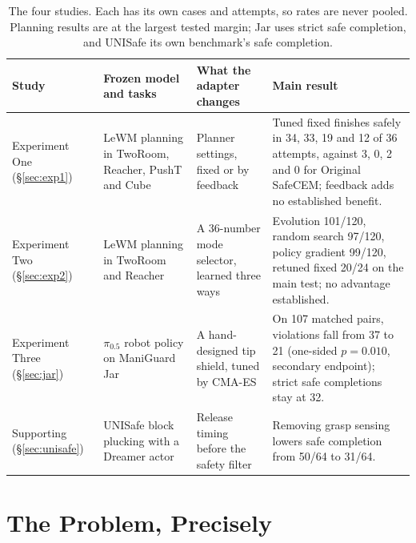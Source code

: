 \documentclass[sigconf,nonacm]{acmart}
\begin{document}
\begin{table}[t]
\caption{The four studies. Each has its own cases and attempts, so rates
are never pooled. Planning results are at the largest tested margin; Jar
uses strict safe completion, and UNISafe its own benchmark's safe
completion.}
\label{tab:studies}\centering\small
\begin{tabularx}{\textwidth}{@{}>{\raggedright\arraybackslash}p{2.3cm}>{\raggedright\arraybackslash}p{3.4cm}>{\raggedright\arraybackslash}p{3.4cm}>{\raggedright\arraybackslash}X@{}}
\toprule
Study & Frozen model and tasks & What the adapter changes & Main result \\
\midrule
Experiment One (\S\ref{sec:exp1}) & LeWM planning in TwoRoom, Reacher, PushT and Cube & Planner settings, fixed or by feedback &
Tuned fixed finishes safely in 34, 33, 19 and 12 of 36 attempts, against
3, 0, 2 and 0 for Original SafeCEM; feedback adds no established benefit. \\
\addlinespace
Experiment Two (\S\ref{sec:exp2}) & LeWM planning in TwoRoom and Reacher & A 36-number mode selector, learned three ways &
Evolution 101/120, random search 97/120, policy gradient 99/120, retuned
fixed 20/24 on the main test; no advantage established. \\
\addlinespace
Experiment Three (\S\ref{sec:jar}) & $\pi_{0.5}$ robot policy on ManiGuard Jar & A hand-designed tip shield, tuned by CMA-ES &
On 107 matched pairs, violations fall from 37 to 21 (one-sided $p=0.010$, secondary endpoint); strict safe
completions stay at 32. \\
\addlinespace
Supporting (\S\ref{sec:unisafe}) & UNISafe block plucking with a Dreamer actor & Release timing before the safety filter &
Removing grasp sensing lowers safe completion from 50/64 to 31/64. \\
\bottomrule
\end{tabularx}
\end{table}

\section{The Problem, Precisely}\label{sec:problem}
\end{document}
